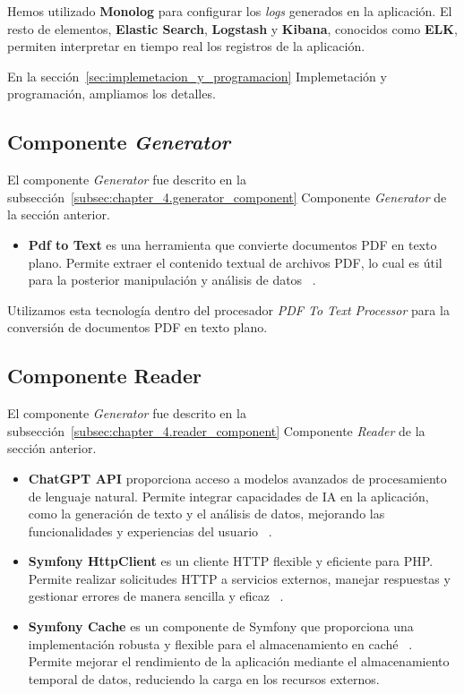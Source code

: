 Hemos utilizado \textbf{Monolog} para configurar los \textit{logs} generados en la aplicación.
El resto de elementos, \textbf{Elastic Search}, \textbf{Logstash} y \textbf{Kibana}, conocidos como \textbf{ELK},
permiten interpretar en tiempo real los registros de la aplicación.

En la sección~\ref{sec:implemetacion_y_programacion} Implemetación y programación, ampliamos los detalles.

\subsection{Componente \textit{Generator}}

El componente \textit{Generator} fue descrito en la subsección~\ref{subsec:chapter_4.generator_component} Componente
\textit{Generator} de la sección anterior.

\begin{itemize}
    \item \textbf{Pdf to Text} es una herramienta que convierte documentos PDF en texto plano.
    Permite extraer el contenido textual de archivos PDF, lo cual es útil para la posterior manipulación y análisis de
    datos ~\cite{url_pdftotextl}.
\end{itemize}

Utilizamos esta tecnología dentro del procesador \textit{PDF To Text Processor} para la conversión de documentos PDF en
texto plano.

\subsection{Componente Reader}

El componente \textit{Generator} fue descrito en la subsección~\ref{subsec:chapter_4.reader_component} Componente
\textit{Reader} de la sección anterior.

\begin{itemize}
    \item \textbf{ChatGPT API} proporciona acceso a modelos avanzados de procesamiento de lenguaje natural.
    Permite integrar capacidades de IA en la aplicación, como la generación de texto y el análisis de datos, mejorando
    las funcionalidades y experiencias del usuario ~\cite{url_chatgpt_api}.
    \item \textbf{Symfony HttpClient} es un cliente HTTP flexible y eficiente para PHP. Permite realizar solicitudes
    HTTP a servicios externos, manejar respuestas y gestionar errores de manera sencilla y eficaz
    ~\cite{url_symfony_http}.
    \item \textbf{Symfony Cache} es un componente de Symfony que proporciona una implementación robusta y flexible
    para el almacenamiento en caché ~\cite{url_symfony_cache}.
    Permite mejorar el rendimiento de la aplicación mediante el almacenamiento temporal de datos, reduciendo la carga en
    los recursos externos.
\end{itemize}

